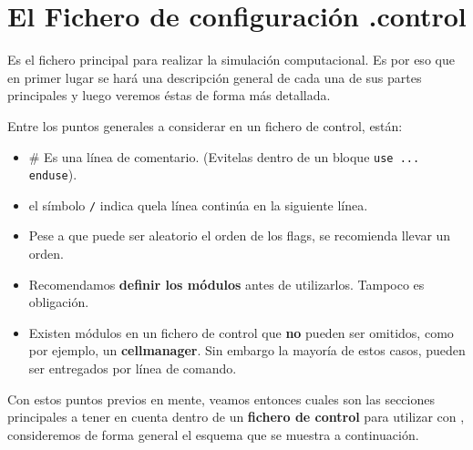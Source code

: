 \section{El Fichero de configuraci\'on .control}

Es el fichero principal para realizar la simulaci\'on computacional. Es por eso que en primer lugar se har\'a una descripci\'on general de cada una de sus partes principales y luego veremos \'estas de forma m\'as detallada.

Entre los puntos generales a considerar en un fichero de control, est\'an:

\begin{itemize}
 \item \# Es una l\'inea de comentario. (Evitelas dentro de un bloque \texttt{use ... enduse}).
 \item el s\'imbolo \verb|/| indica quela l\'inea contin\'ua en la siguiente l\'inea.
 \item Pese a que puede ser aleatorio el orden de los flags, se recomienda llevar un orden.
 \item Recomendamos \textbf{definir los m\'odulos} antes de utilizarlos. Tampoco es obligaci\'on.
 \item Existen m\'odulos en un fichero de control que \textbf{no} pueden ser omitidos, como por ejemplo, un \textbf{cellmanager}. Sin embargo la mayor\'ia de estos casos, pueden ser entregados por l\'inea de comando.
\end{itemize}

Con estos puntos previos en mente, veamos entonces cuales son las secciones principales a tener en cuenta dentro de un \textbf{fichero de control} para utilizar con {\lpmd}, consideremos de forma general el esquema que se muestra a continuaci\'on.



